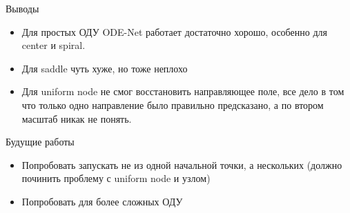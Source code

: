 \documentclass{beamer}
\begin{document}
\begin{frame}{Выводы}
    \begin{itemize}
        \item Для простых ОДУ ODE-Net работает достаточно хорошо, особенно для center и spiral.
        \item Для saddle чуть хуже, но тоже неплохо
        \item Для uniform node не смог восстановить направляющее поле, все дело в том что только одно направление было правильно предсказано, а по втором масштаб никак не понять.
    \end{itemize}
\end{frame}

\begin{frame}{Будущие работы}
    \begin{itemize}
        \item Попробовать запускать не из одной начальной точки, а нескольких (должно починить проблему с uniform node и узлом)
        \item Попробовать для более сложных ОДУ
    \end{itemize}
\end{frame}
\end{document}
